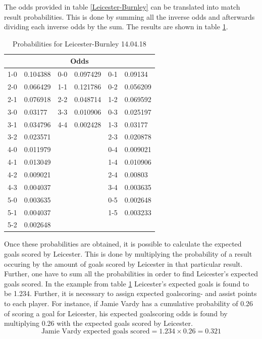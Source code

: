 The odds provided in table \ref{Leicester-Burnley} can be translated into match result probabilities. This is done by summing all the inverse odds and afterwards dividing each inverse odds by the sum. The results are shown in table \ref{Prob.Lei-Bur}.


\begin{table}[H]
\centering
\caption{Probabilities for Leicester-Burnley 14.04.18}
\label{Prob.Lei-Bur}
\begin{tabular}{|ll|ll|ll|}
\multicolumn{6}{c}{Odds}                         \\
\hline
1-0 & 0.104388 & 0-0 & 0.097429 & 0-1 & 0.09134  \\
2-0 & 0.066429 & 1-1 & 0.121786 & 0-2 & 0.056209 \\
2-1 & 0.076918 & 2-2 & 0.048714 & 1-2 & 0.069592 \\
3-0 & 0.03177  & 3-3 & 0.010906 & 0-3 & 0.025197 \\
3-1 & 0.034796 & 4-4 & 0.002428 & 1-3 & 0.03177  \\
3-2 & 0.023571 &     &          & 2-3 & 0.020878 \\
4-0 & 0.011979 &     &          & 0-4 & 0.009021 \\
4-1 & 0.013049 &     &          & 1-4 & 0.010906 \\
4-2 & 0.009021 &     &          & 2-4 & 0.00803  \\
4-3 & 0.004037 &     &          & 3-4 & 0.003635 \\
5-0 & 0.003635 &     &          & 0-5 & 0.002648 \\
5-1 & 0.004037 &     &          & 1-5 & 0.003233 \\
5-2 & 0.002648 &     &          &     &         \\
\hline
\end{tabular}
\end{table}

Once these probabilities are obtained, it is possible to calculate the expected goals scored by Leicester. This is done by multiplying the probability of a result occuring by the amount of goals scored by Leicester in that particular result. Further, one have to sum all the probabilities in order to find Leicester's expected goals scored. In the example from table \ref{Prob.Lei-Bur} Leicester's expected goals is found to be 1.234. 
\newpar
Further, it is necessary to assign expected goalscoring- and assist points to each player. For instance, if Jamie Vardy has a cumulative probability of 0.26 of scoring a goal for Leicester, his expected goalscoring odds is found by multiplying 0.26 with the expected goals scored by Leicester. 
\begin{equation*}
    \textrm{Jamie Vardy expected goals scored} = 1.234 \times 0.26 = 0.321
\end{equation*}


